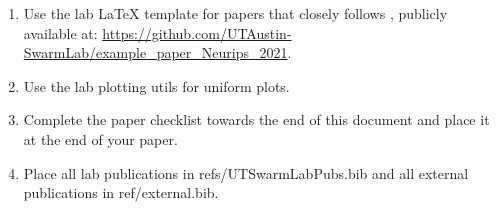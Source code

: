 \begin{enumerate}
    \item Use the lab LaTeX template for papers that closely follows \cite{cheng2021data}, publicly available at: \url{https://github.com/UTAustin-SwarmLab/example_paper_Neurips_2021}.
    \item Use the lab plotting utils for uniform plots.
    \item Complete the paper checklist towards the end of this document and place it at the end of your paper.
    \item Place all lab publications in refs/UTSwarmLabPubs.bib and all external publications in ref/external.bib.
\end{enumerate}




